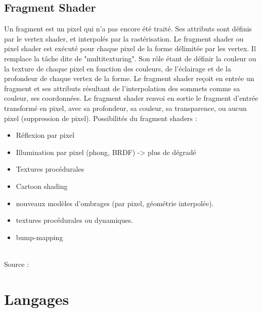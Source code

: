 \subsection{Fragment Shader}
Un fragment est un pixel qui n’a pas encore été traité. Ses attributs sont définis par le vertex shader, et interpolés par la rastérisation.
Le fragment shader ou pixel shader est exécuté pour chaque pixel de la forme délimitée par les vertex. Il remplace la tâche dite de "multitexturing". Son rôle étant de définir la couleur ou la texture de chaque pixel en fonction des couleurs, de l’éclairage et de la profondeur de chaque vertex de la forme.
Le fragment shader reçoit en entrée un fragment et ses attributs résultant de l’interpolation des sommets comme sa couleur, ses coordonnées.
Le fragment shader renvoi en sortie le fragment d’entrée transformé en pixel, avec sa profondeur, sa couleur, sa transparence, ou aucun pixel (suppression de pixel).
Possibilités du fragment shaders :
\begin{itemize}
	\item Réflexion par pixel
	\item Illumination par pixel (phong, BRDF) -> plus de dégradé
	\item Textures procédurales
	\item Cartoon shading
	\item nouveaux modèles d’ombrages (par pixel, géométrie interpolée).
	\item textures procédurales ou dynamiques.
	\item bump-mapping
	\\\\
\end{itemize}


Source : \cite{shader3}

\section{Langages}

